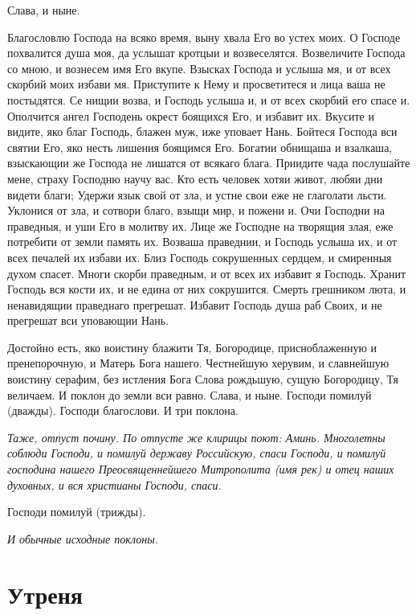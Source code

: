 Слава, и ныне.




Благословлю Господа на всяко время, выну хвала Его во устех моих. О Господе похвалится душа моя, да услышат кротцыи и возвеселятся. Возвеличите Господа со мною, и вознесем имя Его вкупе. Взысках Господа и услыша мя, и от всех скорбий моих избави мя. Приступите к Нему и просветитеся и лица ваша не постыдятся. Се нищии возва, и Господь услыша и, и от всех скорбий его спасе и. Ополчится ангел Господень окрест боящихся Его, и избавит их. Вкусите и видите, яко благ Господь, блажен муж, иже уповает Нань. Бойтеся Господа вси святии Его, яко несть лишения боящимся Его. Богатии обнищаша и взалкаша, взыскающии же Господа не лишатся от всякаго блага. Приидите чада послушайте мене, страху Господню научу вас. Кто есть человек хотяи живот, любяи дни видети благи; Удержи язык свой от зла, и устне свои еже не глаголати льсти. Уклонися от зла, и сотвори благо, взыщи мир, и пожени и. Очи Господни на праведныя, и уши Его в молитву их. Лице же Господне на творящия злая, еже потребити от земли память их. Возваша праведнии, и Господь услыша их, и от всех печалей их избави их. Близ Господь сокрушенных сердцем, и смиренныя духом спасет. Многи скорби праведным, и от всех их избавит я Господь. Хранит Господь вся кости их, и не едина от них сокрушится. Смерть грешником люта, и ненавидящии праведнаго прегрешат. Избавит Господь душа раб Своих, и не прегрешат вси уповающии Нань. 

Достойно есть, яко воистину блажити Тя, Богородице, присноблаженную и пренепорочную, и Матерь Бога нашего. Честнейшую херувим, и славнейшую воистину серафим, без истления Бога Слова рождьшую, сущую Богородицу, Тя величаем. И поклон до земли вси равно. Слава, и ныне. Господи помилуй (дважды). Господи благослови. И три поклона. 


\itshape Таже, отпуст почину. По отпусте же клирицы поют:\normalfont{} Аминь. Многолетны соблюди Господи, и помилуй державу Российскую, спаси Господи, и помилуй господина нашего Преосвященнейшего Митрополита (имя рек) и отец наших духовных, и вся христианы Господи, спаси. 

Господи помилуй (трижды).


\itshape И обычные исходные поклоны.\normalfont{}


\section{Утреня}
 


